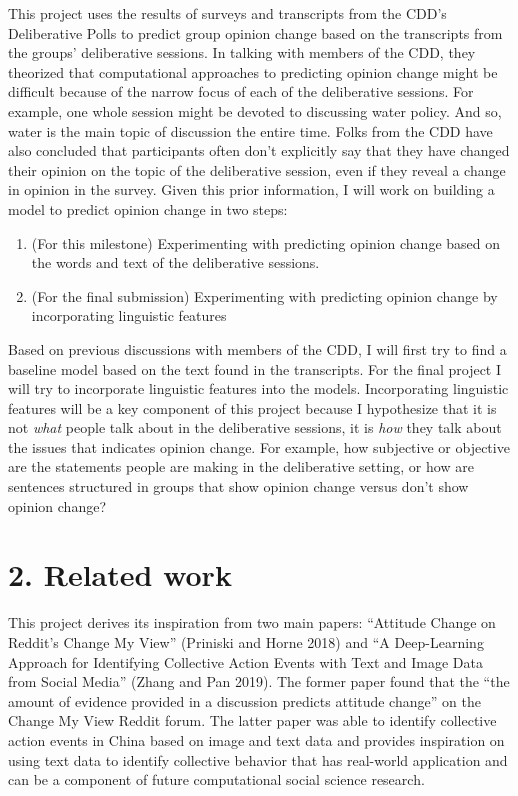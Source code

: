 \documentclass[12pt,]{article}
\providecommand{\tightlist}{%
\setlength{\itemsep}{0pt}\setlength{\parskip}{0pt}}
\begin{document}
This project uses the results of surveys and transcripts from the CDD's
Deliberative Polls to predict group opinion change based on the
transcripts from the groups' deliberative sessions. In talking with
members of the CDD, they theorized that computational approaches to
predicting opinion change might be difficult because of the narrow focus
of each of the deliberative sessions. For example, one whole session
might be devoted to discussing water policy. And so, water is the main
topic of discussion the entire time. Folks from the CDD have also
concluded that participants often don't explicitly say that they have
changed their opinion on the topic of the deliberative session, even if
they reveal a change in opinion in the survey. Given this prior
information, I will work on building a model to predict opinion change
in two steps:

\begin{enumerate}
\def\labelenumi{\arabic{enumi}.}
\tightlist
\item
  (For this milestone) Experimenting with predicting opinion change
  based on the words and text of the deliberative sessions.
\item
  (For the final submission) Experimenting with predicting opinion
  change by incorporating linguistic features
\end{enumerate}

Based on previous discussions with members of the CDD, I will first try
to find a baseline model based on the text found in the transcripts. For
the final project I will try to incorporate linguistic features into the
models. Incorporating linguistic features will be a key component of
this project because I hypothesize that it is not \emph{what} people
talk about in the deliberative sessions, it is \emph{how} they talk
about the issues that indicates opinion change. For example, how
subjective or objective are the statements people are making in the
deliberative setting, or how are sentences structured in groups that
show opinion change versus don't show opinion change?

\hypertarget{related-work}{%
\section{2. Related work}\label{related-work}}

This project derives its inspiration from two main papers: ``Attitude
Change on Reddit's Change My View'' (Priniski and Horne 2018) and ``A
Deep-Learning Approach for Identifying Collective Action Events with
Text and Image Data from Social Media'' (Zhang and Pan 2019). The former
paper found that the ``the amount of evidence provided in a discussion
predicts attitude change'' on the Change My View Reddit forum. The
latter paper was able to identify collective action events in China
based on image and text data and provides inspiration on using text data
to identify collective behavior that has real-world application and can
be a component of future computational social science research.
\end{document}
